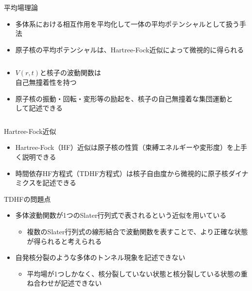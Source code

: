 \documentclass[14pt,aspectratio=169,xcolor=dvipsnames,table,dvipdfmx]{beamer}
\theoremstyle{definition}
\begin{document}
\begin{frame}{平均場理論}
  \begin{itemize}
    \item 多体系における相互作用を平均化して一体の平均ポテンシャルとして扱う手法
    \item 原子核の平均ポテンシャルは、Hartree-Fock近似によって微視的に得られる
  \end{itemize}
  \begin{columns}[t]
    \begin{column}{.5\textwidth}
      \begin{itemize}
        \item $V(r,t)$と核子の波動関数は\\自己無撞着性を持つ
        \item 原子核の振動・回転・変形等の励起を、核子の自己無撞着な集団運動として記述できる
      \end{itemize}
    \end{column}
    \begin{column}{.5\textwidth}
    \end{column}
  \end{columns}
\end{frame}
\begin{frame}{Hartree-Fock近似}
  \begin{itemize}
    \item Hartree-Fock（HF）近似は原子核の性質（束縛エネルギーや変形度）を上手く説明できる
    \item 時間依存HF方程式（TDHF方程式）は核子自由度から微視的に原子核ダイナミクスを記述できる
  \end{itemize}
  \begin{block}{TDHFの問題点}
    \begin{itemize}
      \item 多体波動関数が1つのSlater行列式で表されるという近似を用いている
            \begin{itemize}
              \item 複数のSlater行列式の線形結合で波動関数を表すことで、より正確な状態が得られると考えられる
            \end{itemize}
      \item 自発核分裂のような多体のトンネル現象を記述できない
            \begin{itemize}
              \item 平均場が1つしかなく、核分裂していない状態と核分裂している状態の重ね合わせが記述できない
            \end{itemize}
    \end{itemize}
  \end{block}
\end{frame}
\end{document}
